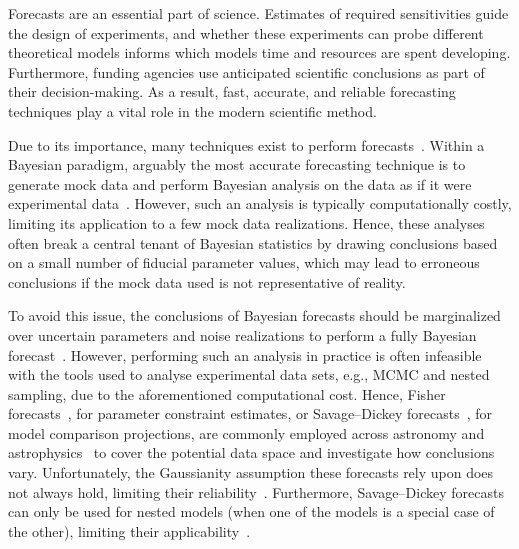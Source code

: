 \documentclass[twocolumn,english,aps,prd,amsmath,amssymb,reprint,floatfix,nofootinbib,showkeys]{revtex4-2}
\newif\ifhighlightchanges
\newcommand{\change}[1]{{\ifhighlightchanges\color{red} #1\else #1\fi}}
\begin{document}
Forecasts are an essential part of science.
Estimates of required sensitivities guide the design of experiments, and whether these experiments can probe different theoretical models informs which models time and resources are spent developing. 
Furthermore, funding agencies use anticipated scientific conclusions as part of their decision-making. 
As a result, fast, accurate, and reliable forecasting techniques play a vital role in the modern scientific method.


Due to its importance, many techniques exist to perform forecasts~\citep[e.g.][]{Fisher_1922, Trotta_2007b, Sellentin_2014, Alvey_2022a, Alvey_2022b, Ryan_2023}. 
Within a Bayesian paradigm, arguably the most accurate forecasting technique is to generate mock data and perform Bayesian analysis on the data as if it were experimental data~\citep[e.g.][]{Anstey_2021, Rieck_2023}.
However, such an analysis is typically computationally costly, limiting its application to a few mock data realizations.
\change{Hence, these analyses often break a central tenant of Bayesian statistics by drawing conclusions based on a small number of fiducial parameter values, which may lead to erroneous conclusions if the mock data used is not representative of reality.}

\change{To avoid this issue, the conclusions of Bayesian forecasts should be marginalized over uncertain parameters and noise realizations to perform a fully Bayesian forecast~\citep{Mukherjee_2006, Sivia_2006, Pahud_2006, Trotta_2007, Trotta_2007b, Gelman_2014, Leung_2017}.
However, performing such an analysis in practice is often infeasible with the tools used to analyse experimental data sets, e.g., MCMC and nested sampling, due to the aforementioned computational cost.}
Hence, Fisher forecasts~\citep{Fisher_1922}\change{, for parameter constraint estimates, or Savage–Dickey forecasts~\citep{Dickey_1971, Trotta_2007b}, for model comparison projections,} are commonly employed across astronomy and astrophysics~\citep{Tegmark_1997, DETF, Trotta_2007b, 2007_Seo, Vallisneri_2008, More_2013, DiDio_2014, Zhai_2017, Bonvin_2018, Simons, Euclid_2020, dAssignies_2023, Mason_2023} to cover the potential data space and investigate how conclusions vary.
Unfortunately, the Gaussianity assumption \change{these} forecasts rely upon does not always hold, limiting their reliability~\citep[e.g.][]{Perotto_2006, Wolz_2012}.
Furthermore, \change{Savage–Dickey} forecasts can only be used for nested models (when one of the models is a special case of the other), limiting their applicability~\citep{Trotta_2007}. 
\end{document}
